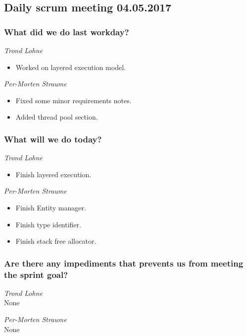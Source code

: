 \documentclass{article}
\begin{document}
\begin{center}
\subsection*{Daily scrum meeting 04.05.2017}
\end{center}
\bigskip


\subsubsection*{What did we do last workday?}

\noindent\textit{Trond Lohne}
\begin{itemize}
	\item
	Worked on layered execution model.
\end{itemize}

\medskip

\noindent\textit{Per-Morten Straume}
\begin{itemize}
	\item
	Fixed some minor requirements notes.

	\item
	Added thread pool section.
\end{itemize}


\subsubsection*{What will we do today?}

\noindent\textit{Trond Lohne}
\begin{itemize}
	\item
	Finish layered execution.
\end{itemize}

\medskip

\noindent\textit{Per-Morten Straume}
\begin{itemize}
	\item
	Finish Entity manager.

	\item
	Finish type identifier.

	\item
	Finish stack free allocator.
\end{itemize}


\subsubsection*{Are there any impediments that prevents us from meeting the sprint goal?}

\noindent\textit{Trond Lohne}\\
None

\medskip

\noindent\textit{Per-Morten Straume}\\
None
\end{document}
